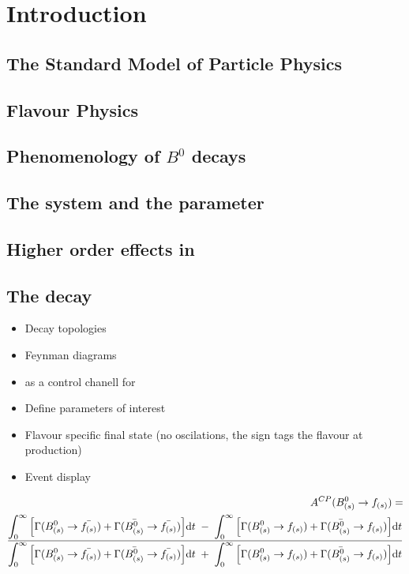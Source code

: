 
\chapter{Introduction}
\label{Introduction}


\section{The Standard Model of Particle Physics}

\section{Flavour Physics}

\section{Phenomenology of $B^0$ decays}
\label{Phenomenology}

\section{The \Bs system and the \phis parameter}

\section{Higher order effects in \phis}

\section{The \BsJpsiKst decay}
\label{TheBsJpsiKstDecay}

\begin{itemize}
\item Decay topologies
\item Feynman diagrams
\item \BsJpsiKst as a control chanell for \phis
\item Define parameters of interest
\item Flavour specific final state (no oscilations, the sign tags the flavour at production)
\item Event display
\end{itemize}



{\small
\begin{eqnarray}
A^{CP} (B^0_{(s)} \to f_{(s)})  = &  \nonumber \\
\frac{ \displaystyle \int_0^\infty \Big[ \Gamma(B^0_{(s)} \to \bar{f_{(s)}}) + \Gamma(\bar{B^0_{(s)}} \to \bar{f_{(s)}}) \Big]
{\rm d}t \;-\; \int_0^\infty \Big[ \Gamma(B^0_{(s)} \to f_{(s)}) + \Gamma(\bar{B^0_{(s)}} \to f_{(s)}) \Big]
{\rm d}t}{ \displaystyle \int_0^\infty \Big[ \Gamma(B^0_{(s)} \to \bar{f_{(s)}}) + \Gamma(\bar{B^0_{(s)}} \to \bar{f_{(s)}}) \Big] {\rm d}t
 \;+\; \int_0^\infty \Big[ \Gamma(B^0_{(s)} \to f_{(s)}) + \Gamma(\bar{B^0_{(s)}} \to f_{(s)}) \Big] {\rm d}t}  & 
\label{decayrates}
\end{eqnarray}
 }

